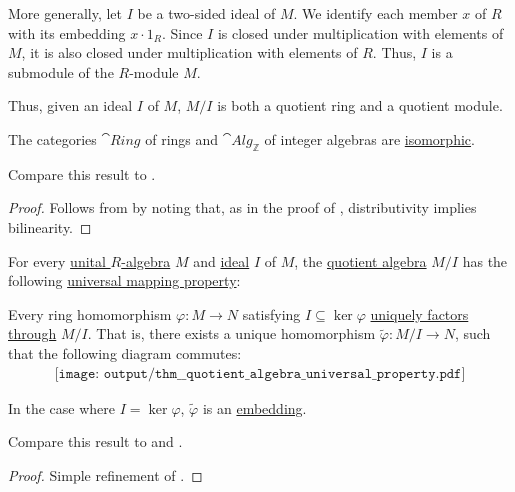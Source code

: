 \begin{definition}
\begin{thmenum}
    More generally, let \( I \) be a two-sided ideal of \( M \). We identify each member \( x \) of \( R \) with its embedding \( x \cdot 1_R \). Since \( I \) is closed under multiplication with elements of \( M \), it is also closed under multiplication with elements of \( R \). Thus, \( I \) is a submodule of the \( R \)-module \( M \).

    Thus, given an ideal \( I \) of \( M \), \( M / I \) is both a quotient ring and a quotient module.
  \end{thmenum}
\end{definition}

\begin{proposition}\label{thm:ring_is_integer_algebra}
  The categories \( \hyperref[def:ring/category]{\cat{Ring}} \) of rings and \( \hyperref[def:algebra_over_ring/category]{\cat{Alg}_\BbbZ} \) of integer algebras are \hyperref[rem:category_similarity/isomorphism]{isomorphic}.

  Compare this result to .
\end{proposition}
\begin{proof}
  Follows from  by noting that, as in the proof of , distributivity implies bilinearity.
\end{proof}

\begin{theorem}\label{thm:quotient_algebra_universal_property}
  For every \hyperref[def:algebra_over_ring]{unital \( R \)-algebra} \( M \) and \hyperref[def:semiring_ideal]{ideal} \( I \) of \( M \), the \hyperref[def:algebra_over_ring/quotient]{quotient algebra} \( M / I \) has the following \hyperref[rem:universal_mapping_property]{universal mapping property}:
  \begin{displayquote}
    Every ring homomorphism \( \varphi: M \to N \) satisfying \( I \subseteq \ker \varphi \) \hyperref[def:factors_through]{uniquely factors through} \( M / I \). That is, there exists a unique homomorphism \( \widetilde{\varphi}: M / I \to N \), such that the following diagram commutes:
    \begin{equation}\label{eq:thm:quotient_algebra_universal_property/diagram}
      \begin{aligned}
        \texttt{[image: output/thm\_\_quotient\_algebra\_universal\_property.pdf]}
      \end{aligned}
    \end{equation}

    In the case where \( I = \ker \varphi \), \( \widetilde{\varphi} \) is an \hyperref[def:first_order_homomorphism_invertibility/embedding]{embedding}.
  \end{displayquote}

  Compare this result to  and .
\end{theorem}
\begin{proof}
  Simple refinement of .
\end{proof}

